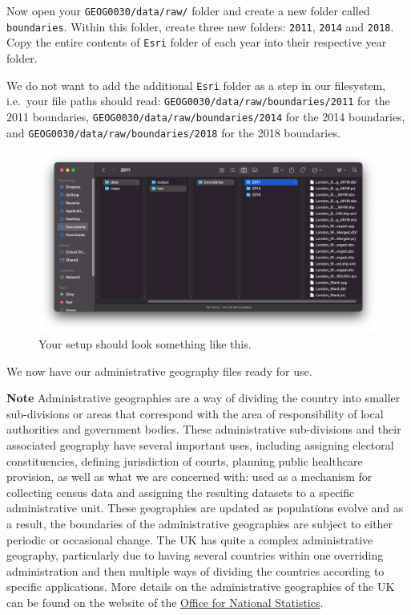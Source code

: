 \documentclass[
]{book}
\begin{document}
Now open your \texttt{GEOG0030/data/raw/} folder and create a new folder called \texttt{boundaries}. Within this folder, create three new folders: \texttt{2011}, \texttt{2014} and \texttt{2018}. Copy the entire contents of \texttt{Esri} folder of each year into their respective year folder.

We do not want to add the additional \texttt{Esri} folder as a step in our filesystem, i.e.~your file paths should read: \texttt{GEOG0030/data/raw/boundaries/2011} for the 2011 boundaries, \texttt{GEOG0030/data/raw/boundaries/2014} for the 2014 boundaries, and \texttt{GEOG0030/data/raw/boundaries/2018} for the 2018 boundaries.

\begin{figure}

{\centering \includegraphics[width=0.9\linewidth]{images/w02/file_management} 

}

\caption{Your setup should look something like this.}\label{fig:02-setup}
\end{figure}

We now have our administrative geography files ready for use.

\textbf{Note}
Administrative geographies are a way of dividing the country into smaller sub-divisions or areas that correspond with the area of responsibility of local authorities and government bodies. These administrative sub-divisions and their associated geography have several important uses, including assigning electoral constituencies, defining jurisdiction of courts, planning public healthcare provision, as well as what we are concerned with: used as a mechanism for collecting census data and assigning the resulting datasets to a specific administrative unit. These geographies are updated as populations evolve and as a result, the boundaries of the administrative geographies are subject to either periodic or occasional change. The UK has quite a complex administrative geography, particularly due to having several countries within one overriding administration and then multiple ways of dividing the countries according to specific applications. More details on the administrative geographies of the UK can be found on the website of the \href{https://www.ons.gov.uk/methodology/geography/ukgeographies/administrativegeography}{Office for National Statistics}.
\end{document}
